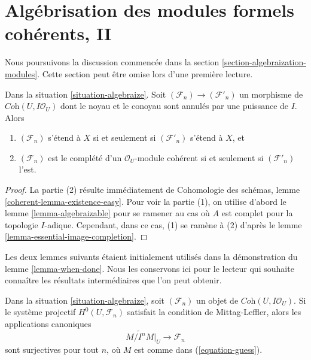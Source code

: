 \section{Algébrisation des modules formels cohérents, II}
\label{section-algebraization-modules-general}

\noindent
Nous poursuivons la discussion commencée dans la
section \ref{section-algebraization-modules}.
Cette section peut être omise lors d'une première lecture.

\begin{lemma}
\label{lemma-map-kernel-cokernel-on-closed}
Dans la situation \ref{situation-algebraize}. Soit
$(\mathcal{F}_n) \to (\mathcal{F}'_n)$ un morphisme de
$\textit{Coh}(U, I\mathcal{O}_U)$
dont le noyau et le conoyau sont annulés par une puissance de $I$. Alors
\begin{enumerate}
\item $(\mathcal{F}_n)$ s'étend à $X$ si et seulement si
$(\mathcal{F}'_n)$ s'étend à $X$, et
\item $(\mathcal{F}_n)$ est le complété d'un $\mathcal{O}_U$-module cohérent
si et seulement si $(\mathcal{F}'_n)$ l'est.
\end{enumerate}
\end{lemma}

\begin{proof}
La partie (2) résulte immédiatement de
Cohomologie des schémas, lemme \ref{coherent-lemma-existence-easy}.
Pour voir la partie (1), on utilise d'abord le lemme \ref{lemma-algebraizable}
pour se ramener au cas où $A$ est complet pour la topologie $I$-adique.
Cependant, dans ce cas, (1) se ramène à (2) d'après le
lemme \ref{lemma-essential-image-completion}.
\end{proof}

\noindent
Les deux lemmes suivants étaient initialement utilisés dans la démonstration
du lemme \ref{lemma-when-done}. Nous les conservons ici pour le lecteur qui
souhaite connaître les résultats intermédiaires que l'on peut obtenir.

\begin{lemma}
\label{lemma-when-ML}
Dans la situation \ref{situation-algebraize}, soit $(\mathcal{F}_n)$ un objet
de $\textit{Coh}(U, I\mathcal{O}_U)$. Si le système projectif
$H^0(U, \mathcal{F}_n)$ satisfait la condition de Mittag-Leffler, alors les applications canoniques
$$
\widetilde{M/I^nM}|_U \to \mathcal{F}_n
$$
sont surjectives pour tout $n$, où $M$ est comme dans (\ref{equation-guess}).
\end{lemma}

